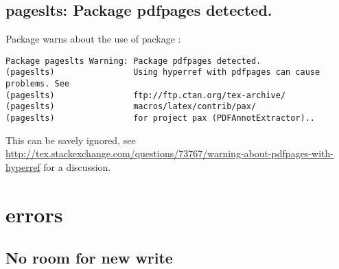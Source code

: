 \subsection{pageslts: Package pdfpages detected.}

Package  warns about the use of package :
%
\begin{verbatim}
Package pageslts Warning: Package pdfpages detected.
(pageslts)                Using hyperref with pdfpages can cause problems. See
(pageslts)                ftp://ftp.ctan.org/tex-archive/
(pageslts)                macros/latex/contrib/pax/
(pageslts)                for project pax (PDFAnnotExtractor)..
\end{verbatim}
%
This can be savely ignored, see \url{http://tex.stackexchange.com/questions/73767/warning-about-pdfpages-with-hyperref} for a discussion.

\section{errors}
\subsection{No room for new write}
\label{sec:problems:write}